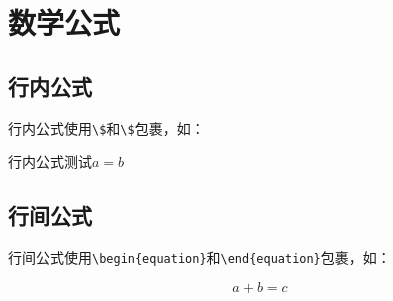 \def\lsym{$\mathsurround=0pt {}^\ell$}
\def\LSYM    #1{$#1$     & \texttt{\string#1}\lsym}

\def\SYM     #1{$#1$     & \texttt{\string#1}}
\def\BIGSYM  #1{$#1$     & $\displaystyle #1$ & \texttt{\string#1}}
\def\ACC   #1#2{$#1{#2}$ & \texttt{\string#1}\{#2\}}
\def\DEL     #1{$\big#1 \bigg#1$ & \texttt{\string#1}}

\def\AMSSYM  #1{$#1$     & \texttt{\string#1}}
\def\AMSM    #1{$#1$     & \textcolor{blue}{\texttt{\string#1}}}
\def\AMSACC#1#2{$#1{#2}$ & \textcolor{blue}{\texttt{\string#1}}\{#2\}}
\def\AMSBIG  #1{$#1$     & $\displaystyle #1$ & \textcolor{blue}{\texttt{\string#1}}}

\def\SC      #1{#1       & \texttt{\string#1}}

\newenvironment{symbols}[1]%
{\small\def\arraystretch{1.1}
    \begin{tabular}{@{}#1@{}}}%
        {\end{tabular}}

\DeclareRobustCommand*\amscmd[1]{\textcolor{blue}{\lstinline{#1}}}
\DeclareRobustCommand*\amsenv[1]{\textcolor{blue}{\lstinline{#1}}}

\chapter{数学公式}\label{chap:math}
\section{行内公式}\label{sec:inline}
行内公式使用\lstinline|\$|和\lstinline|\$|包裹，如：

\begin{codeshow}
    行内公式测试$a=b$
\end{codeshow}

\section{行间公式}\label{sec:display}
行间公式使用\lstinline|\begin{equation}|和\lstinline|\end{equation}|包裹，如：

\begin{codeshow}
    \begin{equation}
        a+b=c
    \end{equation}
\end{codeshow}

